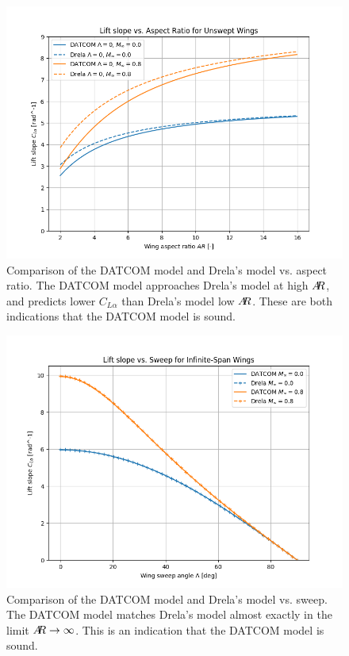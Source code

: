 \documentclass[12pt]{article}
\newcommand{\ar}{A\mkern-6mu R}
\begin{document}
\begin{figure}[hbt!]
    \centering
    \includegraphics[width=1\textwidth]{figures/wing_lift_model_compare/CLa_vs_aspect}
    \caption{\label{fig:wing_model_CLa_vs_aspect} Comparison of the DATCOM model and Drela's model vs. aspect ratio. The DATCOM model approaches Drela's model at high $\ar$, and predicts lower $C_{L\alpha}$ than Drela's model low $\ar$. These are both indications that the DATCOM model is sound.}
\end{figure}

\begin{figure}[hbt!]
    \centering
    \includegraphics[width=1\textwidth]{figures/wing_lift_model_compare/CLa_vs_sweep}
    \caption{\label{fig:wing_model_CLa_vs_sweep} Comparison of the DATCOM model and Drela's model vs. sweep. The DATCOM model matches Drela's model almost exactly in the limit $\ar \rightarrow \infty$. This is an indication that the DATCOM model is sound.}
\end{figure}
\end{document}
